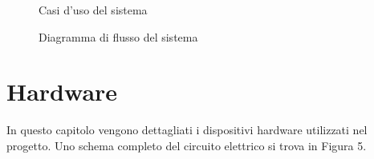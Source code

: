 \documentclass[12pt]{report}
\begin{document}
\begin{figure}
	\caption{Casi d'uso del sistema}
	\label{fig:usecase}
\end{figure}

\begin{figure}
	\caption{Diagramma di flusso del sistema}
	\label{fig:usecase}
\end{figure}



\chapter{Hardware}
\label{cap2}
%

In questo capitolo vengono dettagliati i dispositivi hardware utilizzati nel progetto. Uno schema completo del circuito elettrico si trova in Figura 5.
\end{document}
